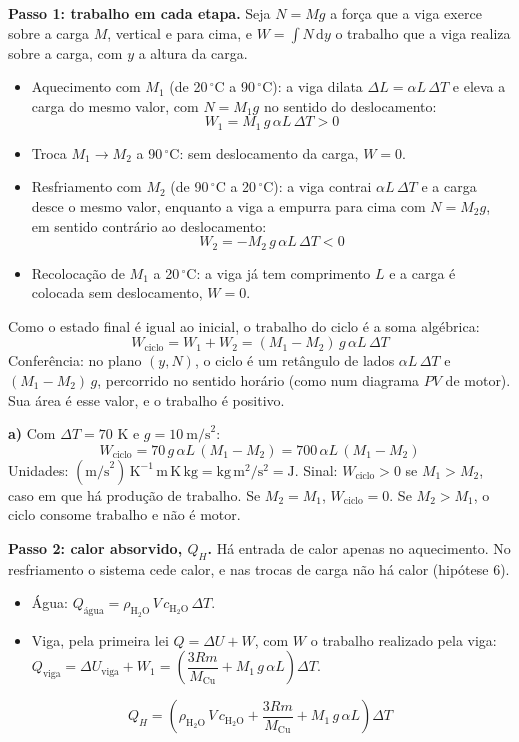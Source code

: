 \documentclass{article}%
\begin{document}
\textbf{Passo 1: trabalho em cada etapa.} Seja $N=Mg$ a força que a viga exerce sobre a carga $M$, vertical e para cima, e $W=\int N\,\mathrm{d}y$ o trabalho que a viga realiza sobre a carga, com $y$ a altura da carga.

\begin{itemize}
\item Aquecimento com $M_1$ (de 20\,$^\circ$C a 90\,$^\circ$C): a viga dilata $\Delta L=\alpha L\,\Delta T$ e eleva a carga do mesmo valor, com $N=M_1 g$ no sentido do deslocamento:
\[ W_1=M_1\,g\,\alpha L\,\Delta T>0 \]
\item Troca $M_1\to M_2$ a 90\,$^\circ$C: sem deslocamento da carga, $W=0$.
\item Resfriamento com $M_2$ (de 90\,$^\circ$C a 20\,$^\circ$C): a viga contrai $\alpha L\,\Delta T$ e a carga desce o mesmo valor, enquanto a viga a empurra para cima com $N=M_2 g$, em sentido contrário ao deslocamento:
\[ W_2=-M_2\,g\,\alpha L\,\Delta T<0 \]
\item Recolocação de $M_1$ a 20\,$^\circ$C: a viga já tem comprimento $L$ e a carga é colocada sem deslocamento, $W=0$.
\end{itemize}

Como o estado final é igual ao inicial, o trabalho do ciclo é a soma algébrica:
\[ W_{\text{ciclo}}=W_1+W_2=(M_1-M_2)\,g\,\alpha L\,\Delta T \]
Conferência: no plano $(y,N)$, o ciclo é um retângulo de lados $\alpha L\,\Delta T$ e $(M_1-M_2)\,g$, percorrido no sentido horário (como num diagrama $PV$ de motor). Sua área é esse valor, e o trabalho é positivo.

\textbf{a)} Com $\Delta T=70$ K e $g=10\ \text{m/s}^2$:
\[ W_{\text{ciclo}}=70\,g\,\alpha L\,(M_1-M_2)=700\,\alpha L\,(M_1-M_2) \]
Unidades: $(\text{m/s}^2)\,\text{K}^{-1}\,\text{m}\,\text{K}\,\text{kg}=\text{kg}\,\text{m}^2/\text{s}^2=\text{J}$. Sinal: $W_{\text{ciclo}}>0$ se $M_1>M_2$, caso em que há produção de trabalho. Se $M_2=M_1$, $W_{\text{ciclo}}=0$. Se $M_2>M_1$, o ciclo consome trabalho e não é motor.

\textbf{Passo 2: calor absorvido, $Q_H$.} Há entrada de calor apenas no aquecimento. No resfriamento o sistema cede calor, e nas trocas de carga não há calor (hipótese 6).
\begin{itemize}
\item Água: $Q_{\text{água}}=\rho_{\text{H}_2\text{O}}\,V\,c_{\text{H}_2\text{O}}\,\Delta T$.
\item Viga, pela primeira lei $Q=\Delta U+W$, com $W$ o trabalho realizado pela viga: $Q_{\text{viga}}=\Delta U_{\text{viga}}+W_1=\left(\dfrac{3Rm}{M_{\text{Cu}}}+M_1\,g\,\alpha L\right)\Delta T$.
\end{itemize}
\[ Q_H=\left(\rho_{\text{H}_2\text{O}}\,V\,c_{\text{H}_2\text{O}}+\frac{3Rm}{M_{\text{Cu}}}+M_1\,g\,\alpha L\right)\Delta T \]
\end{document}
